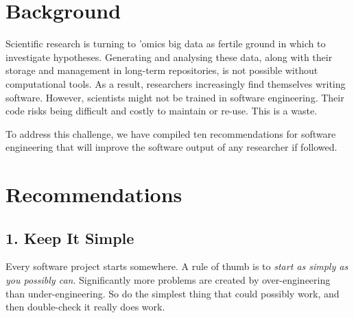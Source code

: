 \documentclass{bmcart}
\begin{document}


\section*{Background}

Scientific research is turning to 'omics big data as fertile ground in which to investigate hypotheses. Generating and analysing these data, along with their storage and management in long-term repositories, is not possible without computational tools. As a result, researchers increasingly find themselves writing software. However, scientists might not be trained in software engineering. Their code risks being difficult and costly to maintain or re-use. This is a waste.

To address this challenge, we have compiled ten recommendations for software engineering that will improve the software output of any researcher if followed. 

\section*{Recommendations}

\subsection*{1. Keep It Simple}

Every software project starts somewhere. A rule of thumb is to \textit{start as simply as you possibly can}. Significantly more problems are created by over-engineering than under-engineering. So do the simplest thing that could possibly work, and then double-check it really does work. 
\end{document}
